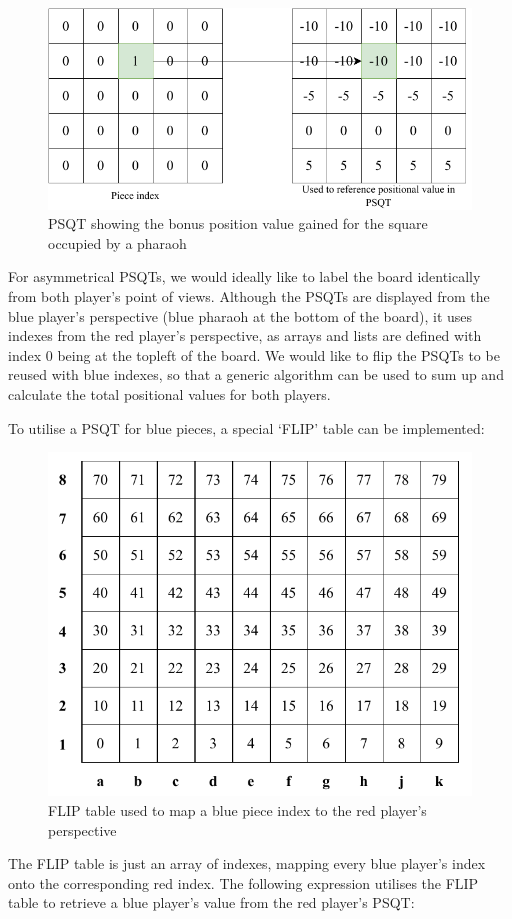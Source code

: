 \documentclass[../main/main.tex]{subfiles}
\begin{document}
\begin{figure}[H]
    \centering
    \includegraphics[width=0.8\columnwidth]{../design/assets/psqt.pdf}
    \caption{PSQT showing the bonus position value gained for the square occupied by a pharaoh}
    \label{fig:psqt}
\end{figure}

For asymmetrical PSQTs, we would ideally like to label the board identically from both player’s point of views. Although the PSQTs are displayed from the blue player's perspective (blue pharaoh at the bottom of the board), it uses indexes from the red player's perspective, as arrays and lists are defined with index 0 being at the topleft of the board. We would like to flip the PSQTs to be reused with blue indexes, so that a generic algorithm can be used to sum up and calculate the total positional values for both players.

To utilise a PSQT for blue pieces, a special ‘FLIP’ table can be implemented:

\begin{figure}[H]
    \centering
    \includegraphics[width=0.6\columnwidth]{../design/assets/bitboard_indexes.pdf}
    \caption{FLIP table used to map a blue piece index to the red player's perspective}
    \label{fig:flip-table}
\end{figure}

The FLIP table is just an array of indexes, mapping every blue player’s index onto the corresponding red index. The following expression utilises the FLIP table to retrieve a blue player’s value from the red player’s PSQT:
\end{document}

